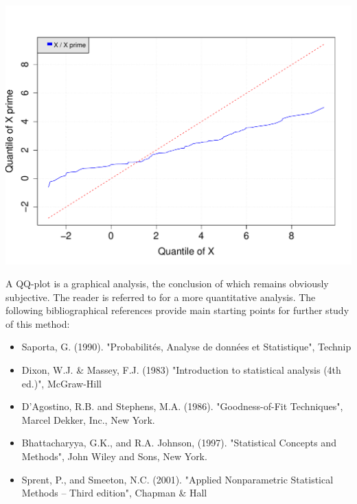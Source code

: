 {  \begin{center}
    \includegraphics[scale=0.5]{Figures/QQplotBad.pdf}
  \end{center}

  \vspace{2mm}
}
{
}

            {
              A QQ-plot is a graphical analysis, the conclusion of which remains obviously subjective. The reader is referred to  for a more quantitative analysis.
              The following bibliographical references provide main starting points for further study of this method:
              \begin{itemize}
              \item Saporta, G. (1990). "Probabilités, Analyse de données et Statistique", Technip
              \item Dixon, W.J. \& Massey, F.J. (1983) "Introduction to statistical analysis (4th ed.)", McGraw-Hill
              \item D'Agostino, R.B. and Stephens, M.A. (1986). "Goodness-of-Fit Techniques", Marcel Dekker, Inc., New York.
              \item Bhattacharyya, G.K., and R.A. Johnson, (1997). "Statistical Concepts and Methods", John Wiley and Sons, New York.
              \item Sprent, P., and Smeeton, N.C. (2001). "Applied Nonparametric Statistical Methods -- Third edition", Chapman \& Hall
            \end{itemize}}
